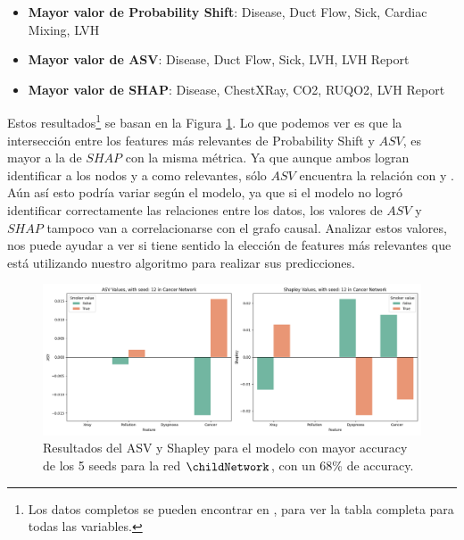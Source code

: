 \begin{itemize}
    \item \textbf{Mayor valor de Probability Shift}: Disease, Duct Flow, Sick, Cardiac Mixing, LVH
    \item \textbf{Mayor valor de ASV}: Disease, Duct Flow, Sick, LVH, LVH Report
    \item \textbf{Mayor valor de SHAP}: Disease, ChestXRay, CO2, RUQO2, LVH Report
\end{itemize}

Estos resultados\footnote{Los datos completos se pueden encontrar en , para ver la tabla completa para todas las variables.} se basan en la Figura \ref{fig:shapleyVsASVSingleSeedChild}. Lo que podemos ver es que la intersección entre los features más relevantes de Probability Shift y $ASV$, es mayor a la de $SHAP$ con la misma métrica. Ya que aunque ambos logran identificar a los nodos  y a  como relevantes, sólo $ASV$ encuentra la relación con  y . Aún así esto podría variar según el modelo, ya que si el modelo no logró identificar correctamente las relaciones entre los datos, los valores de $ASV$ y $SHAP$ tampoco van a correlacionarse con el grafo causal. Analizar estos valores, nos puede ayudar a ver si tiene sentido la elección de features más relevantes que está utilizando nuestro algoritmo para realizar sus predicciones. 

\begin{figure}
    \centering
    \includegraphics[width=1\linewidth]{img/asvResults/cancerASVAndShapleyExactASVAndShapley.png}
    \caption{Resultados del ASV y Shapley para el modelo con mayor accuracy de los 5 seeds para la red $\childNetwork$, con un 68\% de accuracy. }
    \label{fig:shapleyVsASVSingleSeedChild}
\end{figure}

